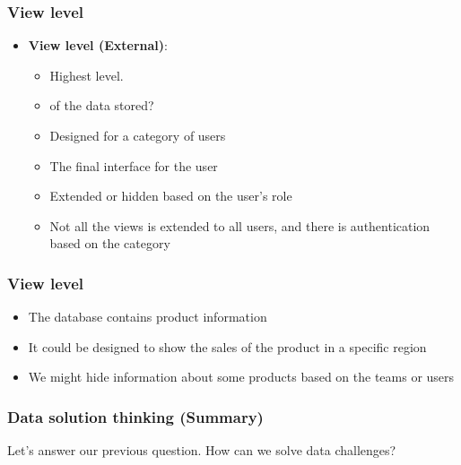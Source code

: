 \VideoClassification
\begin{frame}
	\frametitle{View level}
	\begin{itemize}
		\item \textbf{View level (External)}: 
		\begin{itemize}
			\item Highest level.
			\item \textbf{\underline{}} of the data stored? 
			\item Designed for a category of users
			\item The final interface for the user
			\item Extended or hidden based on the user's role
			\item Not all the views is extended to all users, and there is authentication based on the category
		\end{itemize}		
	\end{itemize}	
	
\end{frame}
\begin{frame}
	\frametitle{View level}
	\begin{example}
		\begin{itemize}
			\item The database contains product information
			\item It could be designed to show the sales of the product in a specific region
			\item We might hide information about some products based on the teams or users
		\end{itemize}
	\end{example}
	
\end{frame}

\VideoClassification[column=2, colour=blue]
\begin{frame}[c]
	\frametitle{Data solution thinking (Summary) }
        \begin{center}
			Let's answer our previous question. How can we solve data challenges?
        \end{center}
    \end{frame}

